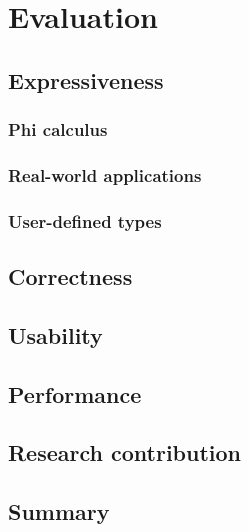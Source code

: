 \chapter{Evaluation}

\section{Expressiveness}

\subsection{Phi calculus}

\subsection{Real-world applications}

\subsection{User-defined types}

\section{Correctness}

\section{Usability}

\section{Performance}

\section{Research contribution}

\section{Summary}
